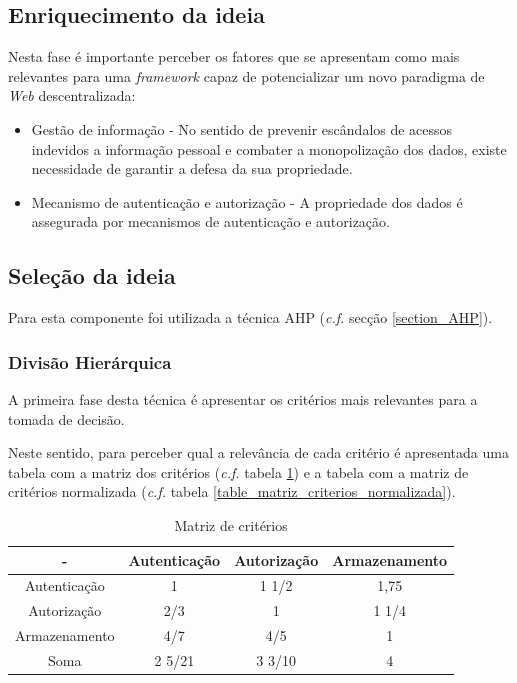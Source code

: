 \subsection{Enriquecimento da ideia}
Nesta fase é importante perceber os fatores que se apresentam como mais relevantes para uma \emph{framework} capaz de potencializar um novo paradigma de \emph{Web} descentralizada:
\begin{itemize}
\item  Gestão de informação - No sentido de prevenir escândalos de acessos indevidos a informação pessoal e combater a monopolização dos dados, existe necessidade de garantir a defesa da sua propriedade.

\item Mecanismo de autenticação e autorização - A propriedade dos dados é assegurada por mecanismos de autenticação e autorização.

\end{itemize}

\subsection{Seleção da ideia}

Para esta componente foi utilizada a técnica \acrshort{AHP} (\emph{c.f.} secção \ref{section_AHP}).

\subsubsection{Divisão Hierárquica}

A primeira fase desta técnica é apresentar os critérios mais relevantes para a tomada de decisão.

Neste sentido, para perceber qual a relevância de cada critério é apresentada uma tabela com a matriz dos critérios (\emph{c.f.} tabela \ref{table_matriz_criterios}) e a tabela com a matriz de critérios normalizada (\emph{c.f.} tabela \ref{table_matriz_criterios_normalizada}).

\begin{table}[h]
\centering
\caption{Matriz de critérios}
\label{table_matriz_criterios}
\vspace{0.5cm}
\begin{tabular}{c|c|c|c} 
 - & Autenticação & Autorização & Armazenamento \\
\hline                          
Autenticação & 1 & 1 1/2 & 1,75 \\
Autorização &  2/3 & 1 & 1 1/4  \\
Armazenamento &  4/7 & 4/5 & 1 \\
Soma & 2 5/21 & 3 3/10 & 4 \\
\end{tabular}
\end{table}

